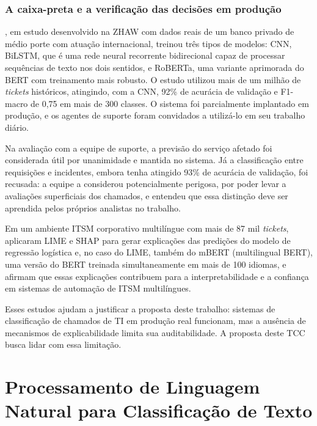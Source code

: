 \documentclass[
    12pt,                %
    openright,           %
    oneside,             %
    a4paper,             %
    english,             %
    brazil               %
]{abntex2}
\begin{document}
\subsubsection{A caixa-preta e a verificação das decisões em produção}
\label{subsubsec:helpdesk_caixapreta}

, em estudo desenvolvido na ZHAW com dados reais 
de um banco privado de médio porte com atuação internacional, treinou três tipos de modelos: CNN, 
BiLSTM, que é uma rede neural recorrente bidirecional capaz de 
processar sequências de texto nos dois sentidos, e RoBERTa, uma 
variante aprimorada do BERT com treinamento mais robusto. O estudo 
utilizou mais de um milhão de \textit{tickets} históricos, atingindo, com a CNN, 
92\% de acurácia de validação e F1-macro de 0,75 em mais de 300 
classes. O sistema foi parcialmente implantado em produção, e os agentes 
de suporte foram convidados a utilizá-lo em seu trabalho diário. 

Na avaliação com a equipe de suporte, a previsão do serviço afetado foi considerada útil por unanimidade e mantida no sistema. Já a classificação entre requisições e incidentes, embora tenha atingido 93\% de acurácia de validação, foi recusada: a equipe a considerou potencialmente perigosa, por poder levar a avaliações superficiais dos chamados, e entendeu que essa distinção deve ser aprendida pelos próprios analistas no trabalho.

Em um ambiente ITSM corporativo multilíngue com mais de 87 mil \textit{tickets},  aplicaram LIME e 
SHAP para gerar explicações das predições do modelo de regressão logística e, no caso do LIME, 
também do mBERT (multilingual BERT), uma versão do BERT treinada simultaneamente 
em mais de 100 idiomas, e afirmam que essas explicações contribuem para a 
interpretabilidade e a confiança em sistemas de automação de ITSM multilíngues.

Esses estudos ajudam a justificar a proposta deste trabalho: sistemas de 
classificação de chamados de TI em produção real funcionam, mas a ausência 
de mecanismos de explicabilidade limita sua auditabilidade. 
A proposta deste TCC busca lidar com essa limitação.

\section{Processamento de Linguagem Natural para Classificação de Texto}
\label{sec:pln}
\end{document}
